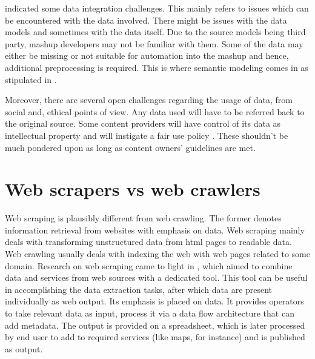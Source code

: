\cite{4} indicated some data integration challenges. This mainly refers to issues which can be encountered with the data involved. There might be issues with the data models and sometimes with the data itself. Due to the source models being third party, mashup developers may not be familiar with them. Some of the data may either be missing or not suitable for automation into the mashup and hence, additional preprocessing is required. This is where semantic modeling comes in as stipulated in \cite{4}.

Moreover, there are several open challenges regarding the usage of data, from social and, ethical points of view. Any data used will have to be referred back to the original source. Some content providers will have control of its data as intellectual property and will instigate a fair use policy \cite{4}. These shouldn’t be much pondered upon as long as content owners’ guidelines are met.


\section{Web scrapers vs web crawlers}

Web scraping is plausibly different from web crawling. The former denotes information retrieval from websites with emphasis on data. Web scraping mainly deals with transforming unstructured data from html pages to readable data. Web crawling usually deals with indexing the web with web pages related to some domain. Research on web scraping came to light in \cite{22}, which aimed to combine data and services from web sources with a dedicated tool. This tool can be useful in accomplishing the data extraction tasks, after which data are present individually as web output. Its emphasis is placed on data. It provides operators to take relevant data as input, process it via a data flow architecture that can add metadata. The output is provided on a spreadsheet, which is later processed by end user to add to required services (like maps, for instance) and is published as output.
